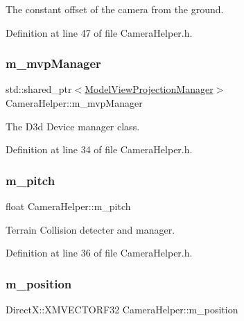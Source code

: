 The constant offset of the camera from the ground. 



Definition at line 47 of file Camera\+Helper.\+h.

\mbox{\label{class_camera_helper_a10d96783299a8c958f84d46542a3d93f}} 
\subsubsection{\texorpdfstring{m\+\_\+mvp\+Manager}{m\_mvpManager}}
{\footnotesize\ttfamily std\+::shared\+\_\+ptr$<$\mbox{\hyperlink{class_model_view_projection_manager}{Model\+View\+Projection\+Manager}}$>$ Camera\+Helper\+::m\+\_\+mvp\+Manager\hspace{0.3cm}{\ttfamily [private]}}



The D3d Device manager class. 



Definition at line 34 of file Camera\+Helper.\+h.

\mbox{\label{class_camera_helper_ae2a32d581a829b05300d7298b5622469}} 
\subsubsection{\texorpdfstring{m\+\_\+pitch}{m\_pitch}}
{\footnotesize\ttfamily float Camera\+Helper\+::m\+\_\+pitch\hspace{0.3cm}{\ttfamily [private]}}



Terrain Collision detecter and manager. 



Definition at line 36 of file Camera\+Helper.\+h.

\mbox{\label{class_camera_helper_a9f225b52b05df432872e8b541079935f}} 
\subsubsection{\texorpdfstring{m\+\_\+position}{m\_position}}
{\footnotesize\ttfamily Direct\+X\+::\+X\+M\+V\+E\+C\+T\+O\+R\+F32 Camera\+Helper\+::m\+\_\+position\hspace{0.3cm}{\ttfamily [private]}}



